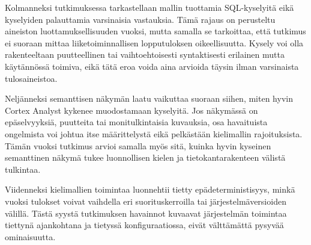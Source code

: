 Kolmanneksi tutkimuksessa tarkastellaan mallin tuottamia SQL-kyselyitä eikä kyselyiden palauttamia varsinaisia vastauksia. Tämä rajaus on perusteltu aineiston luottamuksellisuuden vuoksi, mutta samalla se tarkoittaa, että tutkimus ei suoraan mittaa liiketoiminnallisen lopputuloksen oikeellisuutta. Kysely voi olla rakenteeltaan puutteellinen tai vaihtoehtoisesti syntaktisesti erilainen mutta käytännössä toimiva, eikä tätä eroa voida aina arvioida täysin ilman varsinaista tulosaineistoa.

Neljänneksi semanttisen näkymän laatu vaikuttaa suoraan siihen, miten hyvin Cortex Analyst kykenee muodostamaan kyselyitä. Jos näkymässä on epäselvyyksiä, puutteita tai monitulkintaisia kuvauksia, osa havaituista ongelmista voi johtua itse määrittelystä eikä pelkästään kielimallin rajoituksista. Tämän vuoksi tutkimus arvioi samalla myös sitä, kuinka hyvin kyseinen semanttinen näkymä tukee luonnollisen kielen ja tietokantarakenteen välistä tulkintaa.

Viidenneksi kielimallien toimintaa luonnehtii tietty epädeterministisyys, minkä vuoksi tulokset voivat vaihdella eri suorituskerroilla tai järjestelmäversioiden välillä. Tästä syystä tutkimuksen havainnot kuvaavat järjestelmän toimintaa tiettynä ajankohtana ja tietyssä konfiguraatiossa, eivät välttämättä pysyvää ominaisuutta.
